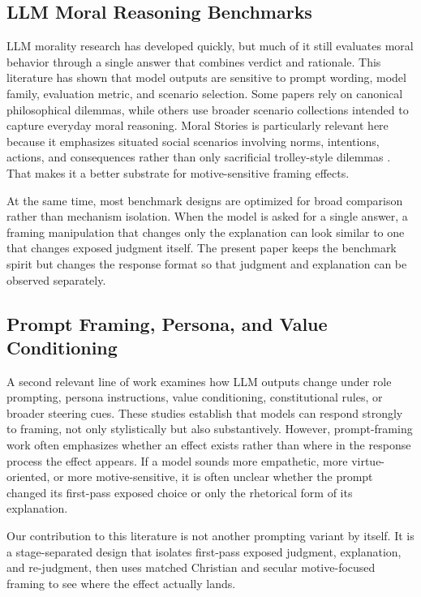 \documentclass[11pt]{article}
\begin{document}
\subsection{LLM Moral Reasoning Benchmarks}

LLM morality research has developed quickly, but much of it still evaluates moral behavior through a single answer that combines verdict and rationale. This literature has shown that model outputs are sensitive to prompt wording, model family, evaluation metric, and scenario selection. Some papers rely on canonical philosophical dilemmas, while others use broader scenario collections intended to capture everyday moral reasoning. Moral Stories is particularly relevant here because it emphasizes situated social scenarios involving norms, intentions, actions, and consequences rather than only sacrificial trolley-style dilemmas \cite{emelin2021moral}. That makes it a better substrate for motive-sensitive framing effects.

At the same time, most benchmark designs are optimized for broad comparison rather than mechanism isolation. When the model is asked for a single answer, a framing manipulation that changes only the explanation can look similar to one that changes exposed judgment itself. The present paper keeps the benchmark spirit but changes the response format so that judgment and explanation can be observed separately.

\subsection{Prompt Framing, Persona, and Value Conditioning}

A second relevant line of work examines how LLM outputs change under role prompting, persona instructions, value conditioning, constitutional rules, or broader steering cues. These studies establish that models can respond strongly to framing, not only stylistically but also substantively. However, prompt-framing work often emphasizes whether an effect exists rather than where in the response process the effect appears. If a model sounds more empathetic, more virtue-oriented, or more motive-sensitive, it is often unclear whether the prompt changed its first-pass exposed choice or only the rhetorical form of its explanation.

Our contribution to this literature is not another prompting variant by itself. It is a stage-separated design that isolates first-pass exposed judgment, explanation, and re-judgment, then uses matched Christian and secular motive-focused framing to see where the effect actually lands.
\end{document}
